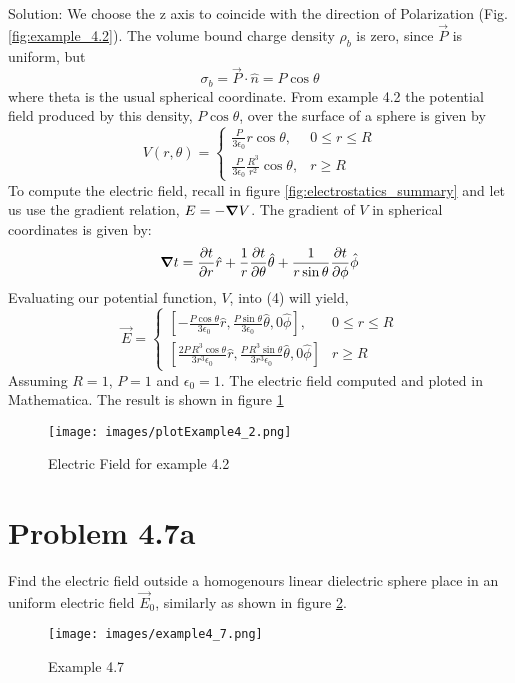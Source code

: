 Solution: We choose the z axis to coincide with the direction of Polarization (Fig. \ref{fig:example_4.2}). The volume bound charge density $\rho_b$ is zero, since $\vec{P}$ is uniform, but
\begin{equation}
	\sigma_b = \vec{P}\cdot\hat{n} = P\cos\theta
\end{equation}
where theta is the usual spherical coordinate. From example 4.2 the potential field produced by this density, $P\cos\theta$, over the surface of a sphere is given by
\begin{equation}
	V(r,\theta) = \begin{cases}
	\frac{P}{3\epsilon_0}r\cos\theta, & 0\leq r\leq R \\
	\frac{P}{3\epsilon_0}\frac{R^3}{r^2}\cos\theta, & r \geq R
	\end{cases}
\end{equation}
To compute the electric field, recall in figure \ref{fig:electrostatics_summary} and let us use the gradient relation, $E = -\mbox{\boldmath$ \nabla $} V$. 
The gradient of $V$ in spherical coordinates is given by:
\begin{equation}
	\mbox{\boldmath$ \nabla $} t = \frac{\partial t}{\partial r}\hat{r} + \frac{1}{r}\frac{\partial t}{\partial \theta}\hat{\theta}+\frac{1}{r\sin\theta} \frac{\partial t}{\partial \phi}\hat{\phi}
\end{equation}
Evaluating our potential function, $V$, into (4) will yield,
\begin{equation}
\vec{E} = \begin{cases}
	\left[ -\frac{P\cos\theta}{3\epsilon_0}\hat{r},\frac{P\sin\theta}{3\epsilon_0}\hat{\theta},0\hat{\phi} \right] , & 0\leq r\leq R \\
	\left[ \frac{2P\,R^3\cos\theta}{3r^3\epsilon_0}\hat{r},\frac{P\,R^3\sin\theta}{3r^3\epsilon_0}\hat{\theta},0\hat{\phi} \right] & r \geq R
\end{cases}
\end{equation}
Assuming $R=1$, $P=1$ and $\epsilon_0=1$. The electric field computed and ploted in Mathematica. The result is shown in figure \ref{fig:Efield_4.2}
\begin{figure}
	\centering
	\texttt{[image: images/plotExample4\_2.png]} 
	\caption{Electric Field for example 4.2}
	\label{fig:Efield_4.2}
\end{figure}

\section{Problem 4.7a}
Find the electric field outside a homogenours linear dielectric sphere place in an uniform electric field $\vec{E}_0$, similarly as shown in figure \ref{fig:example_4.7}.\\
\begin{figure}[h]
	\centering
	\texttt{[image: images/example4\_7.png]} 
	\caption{Example 4.7}
	\label{fig:example_4.7}
\end{figure}

